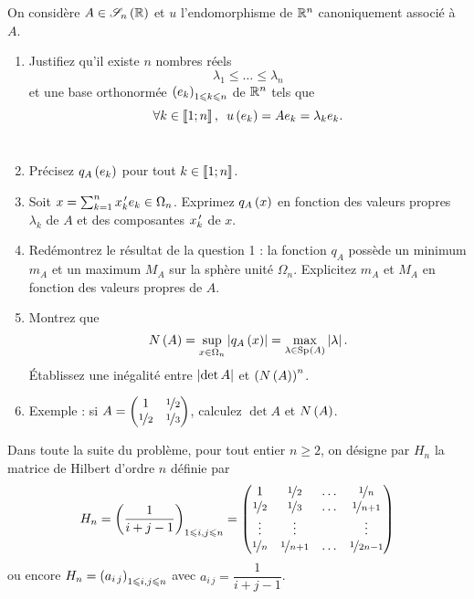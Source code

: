 \begin{q}
On considère \(A\in\sym{n}[\R]\) et \(u\) l'endomorphisme de \(\mathbb{R}^n\) canoniquement associé à \(A\).

\begin{enumerate}
    \item Justifiez qu'il existe \(n\) nombres réels \[\lambda_1\leq\dots\leq\lambda_n\] et une base orthonormée \(\left(e_k\right)_{1\leqslant k\leqslant n}\) de \(\mathbb{R}^n\) tels que \[\quantifs{\forall k\in\interventierii{1}{n}}u\paren{e_k}=Ae_k=\lambda_ke_k.\] \\
    \item Précisez \(q_A\left(e_k\right)\) pour tout \(k\in\left\llbracket1;n\right\rrbracket\). \\
    \item Soit \(x=\sum_{k=1}^nx_k^{\,\prime} e_k\in\Omega_n\). Exprimez \(q_A\left(x\right)\) en fonction des valeurs propres \(\lambda_k\) de \(A\) et des composantes \(x_k^{\,\prime}\) de \(x\). \\
    \item Redémontrez le résultat de la question 1 : la fonction \(q_A\) possède un minimum \(m_A\) et un maximum \(M_A\) sur la sphère unité \(\Omega_n\). Explicitez \(m_A\) et \(M_A\) en fonction des valeurs propres de \(A\). \\
    \item Montrez que \[N\paren{A}=\sup_{x\in\Omega_n}\abs{q_A\paren{x}}=\max_{\lambda\in\Sp{A}}\abs{\lambda}.\] Établissez une inégalité entre \(\left\lvert\det A\right\rvert\) et \(\left(N\left(A\right)\right)^n\). \\
    \item Exemple : si \(A=\begin{pmatrix}
        1 & \nicefrac{1}{2} \\
        \nicefrac{1}{2} & \nicefrac{1}{3}
    \end{pmatrix}\), calculez \(\det A\) et \(N\left(A\right)\).
\end{enumerate}
\end{q}

Dans toute la suite du problème, pour tout entier \(n\geq2\), on désigne par \(H_n\) la matrice de Hilbert d'ordre \(n\) définie par \[H_n=\left(\dfrac{1}{i+j-1}\right)_{1\leqslant i,j\leqslant n}=\begin{pmatrix}
1 & \nicefrac{1}{2} & \dots & \nicefrac{1}{n} \\
\nicefrac{1}{2} & \nicefrac{1}{3} & \dots & \nicefrac{1}{n+1} \\
\vdots & \vdots &  & \vdots \\
\nicefrac{1}{n} & \nicefrac{1}{n+1} & \dots & \nicefrac{1}{2n-1}
\end{pmatrix}\] ou encore \(H_n=\left(a_{i\,j}\right)_{1\leqslant i,j\leqslant n}\) avec \(a_{i\,j}=\dfrac{1}{i+j-1}\).

